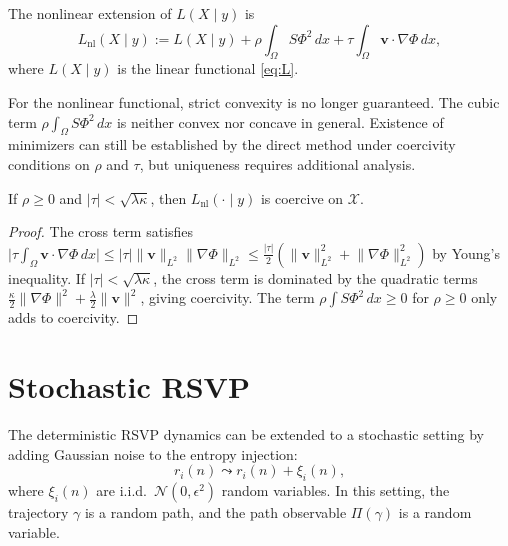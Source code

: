 \documentclass[12pt, oneside]{memoir}
\newcommand{\X}{\mathcal{X}}
\newcommand{\nnorm}[1]{\lVert #1 \rVert}
\newcommand{\bv}{\mathbf{v}}
\begin{document}
\begin{definition}
\label{def:L-nonlin}
The nonlinear extension of $L(X \mid y)$ is
\begin{equation}
  L_{\mathrm{nl}}(X \mid y) := L(X \mid y) +
  \rho \int_\Omega S \Phi^2\, dx +
  \tau \int_\Omega \bv \cdot \nabla\Phi\, dx,
\end{equation}
where $L(X \mid y)$ is the linear functional \cref{eq:L}.
\end{definition}

For the nonlinear functional, strict convexity is no longer guaranteed.  The cubic term
$\rho \int_\Omega S\Phi^2\, dx$ is neither convex nor concave in general.  Existence of
minimizers can still be established by the direct method under coercivity conditions on
$\rho$ and $\tau$, but uniqueness requires additional analysis.

\begin{proposition}
\label{prop:nonlin-coercive}
If $\rho \ge 0$ and $|\tau| < \sqrt{\lambda\kappa}$, then $L_{\mathrm{nl}}(\cdot \mid y)$
is coercive on $\X$.
\end{proposition}

\begin{proof}
The cross term satisfies $\bigl|\tau \int_\Omega \bv \cdot \nabla\Phi\, dx\bigr| \le
|\tau| \nnorm{\bv}_{L^2} \nnorm{\nabla\Phi}_{L^2} \le \frac{|\tau|}{2}
(\nnorm{\bv}_{L^2}^2 + \nnorm{\nabla\Phi}_{L^2}^2)$ by Young's inequality.  If
$|\tau| < \sqrt{\lambda\kappa}$, the cross term is dominated by the quadratic terms
$\frac{\kappa}{2}\nnorm{\nabla\Phi}^2 + \frac{\lambda}{2}\nnorm{\bv}^2$, giving
coercivity.  The term $\rho \int S\Phi^2\, dx \ge 0$ for $\rho \ge 0$ only adds to
coercivity.
\end{proof}

\section{Stochastic RSVP}

The deterministic RSVP dynamics can be extended to a stochastic setting by adding
Gaussian noise to the entropy injection:
\begin{equation}
  r_i(n) \leadsto r_i(n) + \xi_i(n),
\end{equation}
where $\xi_i(n)$ are i.i.d.\ $\mathcal{N}(0, \epsilon^2)$ random variables.  In this
setting, the trajectory $\gamma$ is a random path, and the path observable $\Pi(\gamma)$
is a random variable.
\end{document}
